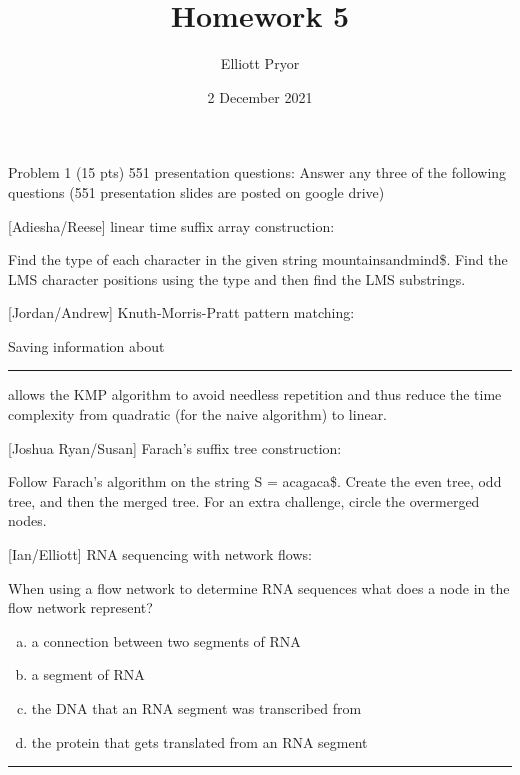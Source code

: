 \documentclass[11pt]{article}
\title{Homework 5}
\author{Elliott Pryor}
\date{2 December 2021}
\begin{document}
\maketitle

Problem 1 (15 pts) 551 presentation questions: Answer any three of the following questions (551 presentation slides are posted on google drive)

[Adiesha/Reese] linear time suffix array construction:

Find the type of each character in the given string mountainsandmind\$. Find the LMS character positions using the type and then find the LMS substrings. 

[Jordan/Andrew] Knuth-Morris-Pratt pattern matching:

Saving information about \rule{2cm}{0.15mm} allows the KMP algorithm to avoid needless repetition and thus reduce the time complexity from quadratic (for the naive algorithm) to linear. 

[Joshua Ryan/Susan] Farach’s suffix tree construction:

Follow Farach’s algorithm on the string S = acagaca\$. Create the even tree, odd tree, and then the merged tree. For an extra challenge, circle the overmerged nodes.

[Ian/Elliott] RNA sequencing with network flows:

When using a flow network to determine RNA sequences what does a node in the flow network represent?
\begin{enumerate}[a)]
    \item a connection between two segments of RNA
    \item a segment of RNA
    \item the DNA that an RNA segment was transcribed from
    \item the protein that gets translated from an RNA segment
\end{enumerate}


\hrule
\end{document}
